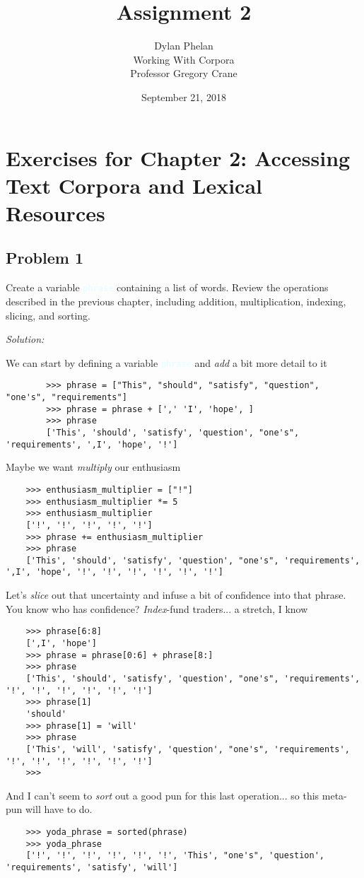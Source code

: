 \documentclass[11pt]{article}
\author{ 
	Dylan Phelan \\ 
	Working With Corpora \\ 
	Professor Gregory Crane 
}
\title{Assignment 2}
\date{September 21, 2018}
\newenvironment{solution}{
	\vspace{10px}\noindent\emph{Solution:}
}{
	\vspace{10px}
}
\newcommand{\codeword}[1]{
	\texttt{\textcolor{lightCyan}{#1}}
}
\begin{document}
\maketitle

\section*{Exercises for Chapter 2: Accessing Text Corpora and Lexical Resources}
\subsection*{Problem 1}

Create a variable \codeword{phrase} containing a list of words. Review the operations described in the previous chapter, including addition, multiplication, indexing, slicing, and sorting.

\begin{solution}
	
	We can start by defining a variable \codeword{phrase} and \emph{add} a bit more detail to it
	\begin{lstlisting}
		>>> phrase = ["This", "should", "satisfy", "question", "one's", "requirements"]
		>>> phrase = phrase + [',' 'I', 'hope', ]
		>>> phrase
        ['This', 'should', 'satisfy', 'question', "one's", 'requirements', ',I', 'hope', '!']
	\end{lstlisting}

    Maybe we want \emph{multiply} our enthusiasm 
	\begin{lstlisting}
	>>> enthusiasm_multiplier = ["!"]
	>>> enthusiasm_multiplier *= 5
	>>> enthusiasm_multiplier
	['!', '!', '!', '!', '!']
	>>> phrase += enthusiasm_multiplier
	>>> phrase
	['This', 'should', 'satisfy', 'question', "one's", 'requirements', ',I', 'hope', '!', '!', '!', '!', '!', '!']
	\end{lstlisting}

	Let's \emph{slice} out that uncertainty and infuse a bit of confidence into that phrase. You know who has confidence? \emph{Index}-fund traders... {\tiny a stretch, I know}
	\begin{lstlisting}
	>>> phrase[6:8]
	[',I', 'hope']
	>>> phrase = phrase[0:6] + phrase[8:]
	>>> phrase
	['This', 'should', 'satisfy', 'question', "one's", 'requirements', '!', '!', '!', '!', '!', '!']
	>>> phrase[1]
	'should'
	>>> phrase[1] = 'will'
	>>> phrase
	['This', 'will', 'satisfy', 'question', "one's", 'requirements', '!', '!', '!', '!', '!', '!']
	>>>
	\end{lstlisting}
	
	And I can't seem to \emph{sort} out a good pun for this last operation... so this meta-pun will have to do.
	\begin{lstlisting}
	>>> yoda_phrase = sorted(phrase)
	>>> yoda_phrase
	['!', '!', '!', '!', '!', '!', 'This', "one's", 'question', 'requirements', 'satisfy', 'will']
	\end{lstlisting}
	
\end{solution} 
\end{document}
